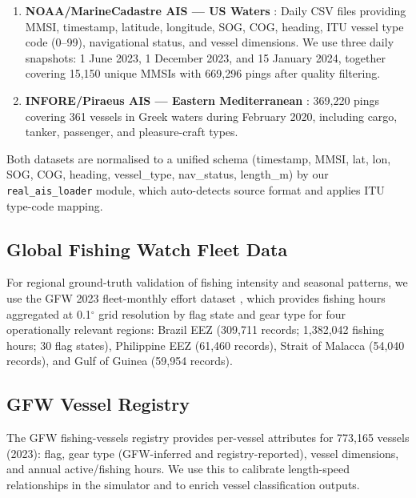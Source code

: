 \documentclass[journal]{IEEEtran}
\begin{document}
\begin{enumerate}
  \item \textbf{NOAA/MarineCadastre AIS — US Waters}
        \cite{noaa_ais2024}: Daily CSV files providing MMSI, timestamp,
        latitude, longitude, SOG, COG, heading, ITU vessel type code (0–99),
        navigational status, and vessel dimensions. We use three daily
        snapshots: 1 June 2023, 1 December 2023, and 15 January 2024,
        together covering 15,150 unique MMSIs with 669,296 pings after
        quality filtering.

  \item \textbf{INFORE/Piraeus AIS — Eastern Mediterranean}
        \cite{kondylakis2020infore}: 369,220 pings covering 361 vessels in
        Greek waters during February 2020, including cargo, tanker,
        passenger, and pleasure-craft types.
\end{enumerate}

Both datasets are normalised to a unified schema
(timestamp, MMSI, lat, lon, SOG, COG, heading, vessel\_type, nav\_status,
length\_m) by our \texttt{real\_ais\_loader} module, which auto-detects
source format and applies ITU type-code mapping.

\subsection{Global Fishing Watch Fleet Data}

For regional ground-truth validation of fishing intensity and seasonal
patterns, we use the GFW 2023 fleet-monthly effort dataset
\cite{kroodsma2018tracking, gfw_zenodo2024}, which provides fishing hours
aggregated at 0.1$^\circ$ grid resolution by flag state and gear type for
four operationally relevant regions:
Brazil EEZ (309,711 records; 1,382,042 fishing hours; 30 flag states),
Philippine EEZ (61,460 records),
Strait of Malacca (54,040 records), and
Gulf of Guinea (59,954 records).

\subsection{GFW Vessel Registry}

The GFW fishing-vessels registry \cite{gfw_zenodo2024} provides per-vessel
attributes for 773,165 vessels (2023): flag, gear type (GFW-inferred and
registry-reported), vessel dimensions, and annual active/fishing hours. We
use this to calibrate length-speed relationships in the simulator and to
enrich vessel classification outputs.
\end{document}
